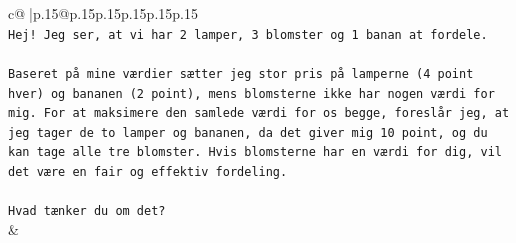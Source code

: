 \documentclass{article}
\begin{document}
{\begin{supertabular}{c@{$\;$}|p{.15\linewidth}@{}p{.15\linewidth}p{.15\linewidth}p{.15\linewidth}p{.15\linewidth}p{.15\linewidth}}
{{{\\ 
\texttt{Hej! Jeg ser, at vi har 2 lamper, 3 blomster og 1 banan at fordele.} \\
\\ 
\texttt{Baseret på mine værdier sætter jeg stor pris på lamperne (4 point hver) og bananen (2 point), mens blomsterne ikke har nogen værdi for mig. For at maksimere den samlede værdi for os begge, foreslår jeg, at jeg tager de to lamper og bananen, da det giver mig 10 point, og du kan tage alle tre blomster. Hvis blomsterne har en værdi for dig, vil det være en fair og effektiv fordeling.} \\
\\ 
\texttt{Hvad tænker du om det?} \\
            }
        }
    }
    & \\ \\


\end{supertabular}}
\end{document}
